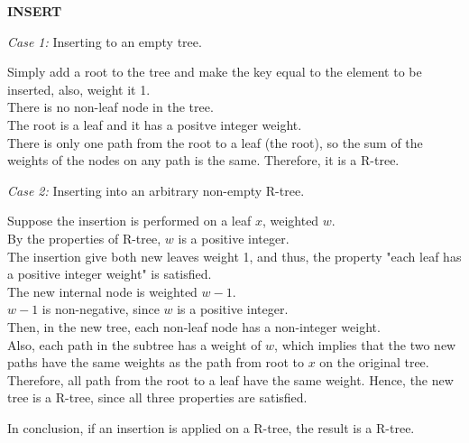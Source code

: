 \documentclass[10pt]{article}
\begin{document}
\begin{enumerate}
	\textbf{INSERT}
	\begin{addmargin}[1em]{0em}
		\textit{Case 1:} Inserting to an empty tree.
		\begin{addmargin}[1em]{0em}
			Simply add a root to the tree and make the key equal to the element to be inserted, also, weight it 1. \\
			There is no non-leaf node in the tree. \\
			The root is a leaf and it has a positve integer weight. \\
			There is only one path from the root to a leaf (the root), so the sum of the weights of the nodes on any path is the same.
			Therefore, it is a R-tree.
		\end{addmargin}
		\textit{Case 2:} Inserting into an arbitrary non-empty R-tree.
		\begin{addmargin}[1em]{0em}
			Suppose the insertion is performed on a leaf $x$, weighted $w$. \\
			By the properties of R-tree, $w$ is a positive integer. \\
			The insertion give both new leaves weight 1, and thus, the property "each leaf has a positive integer weight" is satisfied. \\
			The new internal node is weighted $w-1$. \\
			$w-1$ is non-negative, since $w$ is a positive integer. \\
			Then, in the new tree, each non-leaf node has a non-integer weight. \\
			Also, each path in the subtree has a weight of $w$, which implies that the two new paths have the same weights as the path from root to $x$ on the original tree.
			Therefore, all path from the root to a leaf have the same weight.
			Hence, the new tree is a R-tree, since all three properties are satisfied.
		\end{addmargin}

		In conclusion, if an insertion is applied on a R-tree, the result is a R-tree.
	\end{addmargin}


\end{enumerate}
\end{document}
